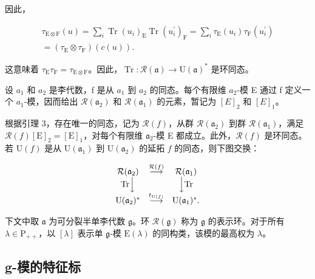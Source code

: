 因此，

\[
\begin{array}{l} \tau_ {\mathrm{E} \otimes \mathrm{F}} (u) = \sum_ {i} \operatorname{Tr} (u _ {i}) _ {\mathrm{E}} \operatorname{Tr} (u _ {i} ^ {\prime}) _ {\mathrm{F}} = \sum_ {i} \tau_ {\mathrm{E}} (u _ {i}) \tau_ {\mathrm{F}} (u _ {i} ^ {\prime}) \\ = (\tau_ {\mathrm{E}} \otimes \tau_ {\mathrm{F}}) (c (u)). \end{array}
\]

这意味着 \(\tau_{\mathrm{E}}\tau_{\mathrm{F}} = \tau_{\mathrm{E}\otimes \mathrm{F}}\)。因此，\(\operatorname {Tr}:\mathcal{R}(\mathfrak{a})\to \mathrm{U}(\mathfrak{a})^*\) 是环同态。

设 \(a_{1}\) 和 \(a_{2}\) 是李代数，f 是从 \(a_{1}\) 到 \(a_{2}\) 的同态。每个有限维 \(a_{2}\)-模 E 通过 f 定义一个 \(a_{1}\)-模，因而给出 \(\mathcal{R}(\mathfrak{a}_{2})\) 和 \(\mathcal{R}(\mathfrak{a}_{1})\) 的元素，暂记为 \([E]_{2}\) 和 \([E]_{1}\)。

根据引理 3，存在唯一的同态，记为 \(\mathcal{R}(f)\)，从群 \(\mathcal{R}(\mathfrak{a}_2)\) 到群 \(\mathcal{R}(\mathfrak{a}_1)\)，满足 \(\mathcal{R}(f)[\mathrm{E}]_2 = [\mathrm{E}]_1\)，对每个有限维 \(\mathfrak{a}_2\)-模 E 都成立。此外，\(\mathcal{R}(f)\) 是环同态。若 \(\mathrm{U}(f)\) 是从 \(\mathrm{U}(\mathfrak{a}_1)\) 到 \(\mathrm{U}(\mathfrak{a}_2)\) 的延拓 \(f\) 的同态，则下图交换：

\[
\begin{array}{c c c} \mathcal {R} (\mathfrak {a} _ {2}) & \stackrel {{\mathcal {R} (f)}} {{\longrightarrow}} & \mathcal {R} (\mathfrak {a} _ {1}) \\ \mathrm{Tr} \Big \downarrow & & \Big \downarrow \mathrm{Tr} \\ \mathrm{U} (\mathfrak {a} _ {2}) ^ {*} & \stackrel {{t _ {\mathrm{U} (f)}}} {{\longrightarrow}} & \mathrm{U} (\mathfrak {a} _ {1}) ^ {*}. \end{array}
\]

下文中取 \(\mathfrak{a}\) 为可分裂半单李代数 \(\mathfrak{g}\)。环 \(\mathcal{R}(\mathfrak{g})\) 称为 \(\mathfrak{g}\) 的表示环。对于所有 \(\lambda \in \mathrm{P}_{++}\)，以 \([\lambda]\) 表示单 \(\mathfrak{g}\)-模 \(\mathrm{E}(\lambda)\) 的同构类，该模的最高权为 \(\lambda\)。

\subsection{g-模的特征标}

